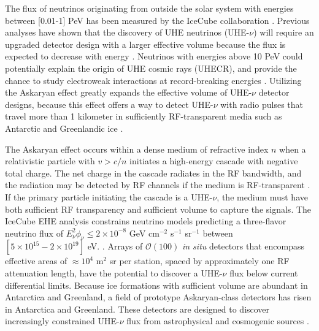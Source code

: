 \documentclass[amsmath,amssymb,aps,prd,10pt,twocolumn]{revtex4}
\begin{document}
The flux of neutrinos originating from outside the solar system with energies between [0.01-1] PeV has been measured by the IceCube collaboration \cite{10.1126/science.1242856}.  Previous analyses have shown that the discovery of UHE neutrinos (UHE-$\nu$) will require an upgraded detector design with a larger effective volume because the flux is expected to decrease with energy \cite{10.1016/j.astropartphys.2010.06.003,10.1088/1475-7516/2010/10/013,10.1103/physrevd.98.062003,10.1088/1475-7516/2020/03/053,10.1103/physrevd.102.043021}.  Neutrinos with energies above 10 PeV could potentially explain the origin of UHE cosmic rays (UHECR), and provide the chance to study electroweak interactions at record-breaking energies \cite{Ackermann:201946d,Ackermann:20195ec}.  Utilizing the Askaryan effect greatly expands the effective volume of UHE-$\nu$ detector designs, because this effect offers a way to detect UHE-$\nu$ with radio pulses that travel more than 1 kilometer in sufficiently RF-transparent media such as Antarctic and Greenlandic ice \cite{10.3189/2015jog14j214, 10.3189/2015jog15j057, 10.1016/j.astropartphys.2011.11.010}.

The Askaryan effect occurs within a dense medium of refractive index $n$ when a relativistic particle with $v > c/n$ initiates a high-energy cascade with negative total charge.  The net charge in the cascade radiates in the RF bandwidth, and the radiation may be detected by RF channels if the medium is RF-transparent \cite{askaryan1} \cite{zhs}.  If the primary particle initiating the cascade is a UHE-$\nu$, the medium must have both sufficient RF transparency and sufficient volume to capture the signals.  The IceCube EHE analysis constrains neutrino models predicting a three-flavor neutrino flux of $E_\nu^2 \phi_\nu \leq 2 \times 10^{-8}$ GeV cm$^{-2}$ s$^{-1}$ sr$^{-1}$ between $[5\times 10^{15} - 2\times 10^{19}]$ eV. \cite{10.1103/physrevd.98.062003}.  Arrays of $\mathcal{O}(100)$ \textit{in situ} detectors that encompass effective areas of $\approx 10^4$ m$^2$ sr per station, spaced by approximately one RF attenuation length, have the potential to discover a UHE-$\nu$ flux below current differential limits.  Because ice formations with sufficient volume are abundant in Antarctica and Greenland, a field of prototype Askaryan-class detectors has risen in Antarctica and Greenland.  These detectors are designed to discover increasingly constrained UHE-$\nu$ flux from astrophysical and cosmogenic sources \cite{10.1103/PhysRevD.85.062004,10.1088/1475-7516/2020/03/053,10.1103/physrevd.102.043021,10.1103/physrevd.99.122001}.
\end{document}
